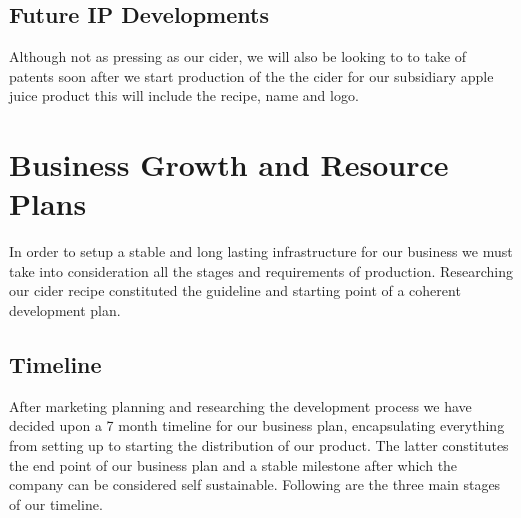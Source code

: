 \documentclass[11pt]{article}
\begin{document}
  \subsection{Future IP Developments}
Although not as pressing as our cider, we will also be looking to to take of
patents soon after we start production of the the cider for our subsidiary apple
juice product this will include the recipe, name and logo.

\newpage


\section{Business Growth and Resource Plans}
In order to setup a stable and long lasting infrastructure for our business we
must take into consideration all the stages and requirements of production.
Researching our cider recipe constituted the guideline and starting point of a
coherent development plan.

  \subsection{Timeline}
After marketing planning and researching the development process we have decided
upon a 7 month timeline for our business plan, encapsulating everything from
setting up to starting the distribution of our product. The latter constitutes
the end point of our business plan and a stable milestone after which the
company can be considered self sustainable. Following are the three main stages
of our timeline.
\end{document}
